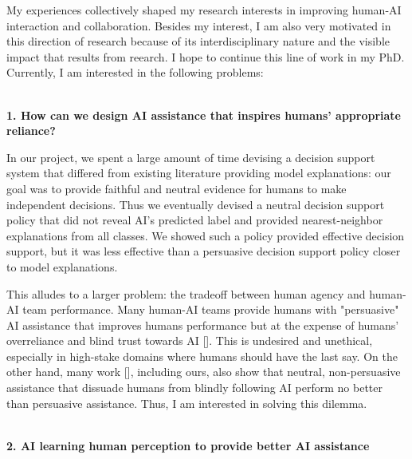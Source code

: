 
My experiences collectively shaped my research interests in improving human-AI interaction and collaboration.
Besides my interest, I am also very motivated in this direction of research because of its interdisciplinary nature and the visible impact that results from reearch.
I hope to continue this line of work in my PhD.
Currently, I am interested in the following problems:


\noindent \textbf{\\1. How can we design AI assistance that inspires humans' appropriate reliance?}


In our project, we spent a large amount of time devising a decision support system that differed from existing literature providing model explanations: our goal was to provide faithful and neutral evidence for humans to make independent decisions. Thus we eventually devised a neutral decision support policy that did not reveal AI's predicted label and provided nearest-neighbor explanations from all classes. 
We showed such a policy provided effective decision support, but it was less effective than a persuasive decision support policy closer to model explanations. 

This alludes to a larger problem: the tradeoff between human agency and human-AI team performance. 
Many human-AI teams provide humans with "persuasive" AI assistance that improves humans performance but at the expense of humans' overreliance and blind trust towards AI []. This is undesired and unethical, especially in high-stake domains where humans should have the last say.
On the other hand, many work [], including ours, also show that neutral, non-persuasive assistance that dissuade humans from blindly following AI perform no better than persuasive assistance. 
Thus, I am interested in solving this dilemma.



\noindent \textbf{\\2. AI learning human perception to provide better AI assistance}


